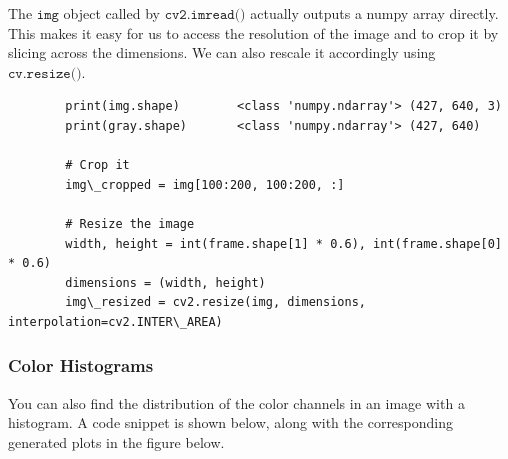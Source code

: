 \documentclass{article}
\begin{document}
      The $\texttt{img}$ object called by $\texttt{cv2.imread()}$ actually outputs a numpy array directly. This makes it easy for us to access the resolution of the image and to crop it by slicing across the dimensions. We can also rescale it accordingly using $\texttt{cv.resize()}$. 
      \begin{lstlisting}
        print(img.shape)        <class 'numpy.ndarray'> (427, 640, 3)
        print(gray.shape)       <class 'numpy.ndarray'> (427, 640)

        # Crop it 
        img\_cropped = img[100:200, 100:200, :]

        # Resize the image 
        width, height = int(frame.shape[1] * 0.6), int(frame.shape[0] * 0.6) 
        dimensions = (width, height) 
        img\_resized = cv2.resize(img, dimensions, interpolation=cv2.INTER\_AREA) 
      \end{lstlisting}

    \subsubsection{Color Histograms}

      You can also find the distribution of the color channels in an image with a histogram. A code snippet is shown below, along with the corresponding generated plots in the figure below. 
\end{document}
